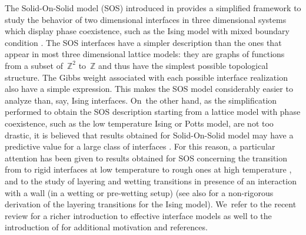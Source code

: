 \documentclass[JEP,XML,SOM,Unicode, NoFloatCountersInSection]{cedram}
\numberwithin{equation}{section}
\theoremstyle{plain}
\theoremstyle{definition}
\newcommand{\bbZ}{{\ensuremath{\mathbb Z}} }
\begin{document}
The Solid-On-Solid model (SOS) introduced in \cite{cf:BCF, cf:T} provides a simplified framework
to study the behavior of two dimensional interfaces in three dimensional systems which display phase coexistence,
such as the Ising model with mixed boundary condition \cite{cf:Dob}.
The SOS interfaces have a simpler description than the ones that appear in most three dimensional lattice models: they are graphs of functions from a subset of~$\bbZ^2$ to~$\bbZ$ and thus have the simplest possible topological structure. The Gibbs weight associated with each possible interface realization also
have a simple expression.
This makes the SOS model considerably easier to analyze than, say, Ising interfaces. On~the other hand, as the simplification performed to obtain
the SOS description starting from a lattice model with phase coexistence, such as the low temperature Ising or Potts model, are not too drastic,
it is believed that results obtained for Solid-On-Solid model may have a predictive value for a large class of interfaces \cite{cf:BCF,cf:T,cf:WGL}.
For this reason, a particular attention has been given to results obtained for SOS concerning the transition from
to rigid interfaces at low temperature to rough ones at high temperature \cite{cf:BM, cf:FS, cf:Swend}, and to the study of layering and wetting transitions
in presence of an interaction with a wall (in a wetting or pre-wetting setup) \cite{cf:ADM, cf:AY, cf:BMF,cf:CM, cf:CM2, cf:chal,cf:DM} (see also \cite{cf:Bas} for a non-rigorous derivation of the layering transitions for the Ising model).
We~refer to the recent review \cite{cf:IV} for a richer introduction to effective interface models as well to the introduction of \cite{cf:part1}
for additional motivation and references.
\end{document}
